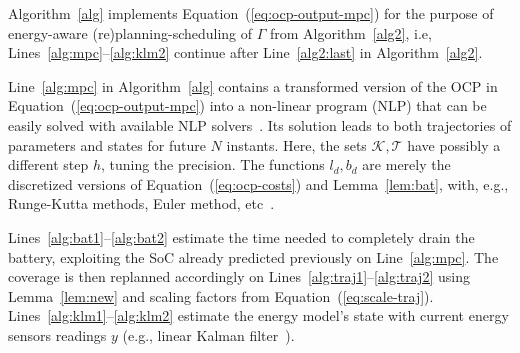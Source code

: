 \documentclass[letterpaper,10pt,journal,twoside]{IEEEtran}
\theoremstyle{definition}
\begin{document}
Algorithm~\ref{alg} implements Equation~(\ref{eq:ocp-output-mpc}) for the purpose of energy-aware (re)planning-scheduling of $\Gamma$ from Algorithm~\ref{alg2}, i.e, Lines~\ref{alg:mpc}--\ref{alg:klm2} continue after Line~\ref{alg2:last} in Algorithm~\ref{alg2}. 

Line~\ref{alg:mpc} in Algorithm~\ref{alg} contains a transformed version of the OCP in Equation~(\ref{eq:ocp-output-mpc}) into a non-linear program (NLP) that can be easily solved with available NLP solvers~\cite{rawlings2017model}. Its solution leads to both trajectories of parameters and states for future $N$ instants. Here, the sets $\mathcal{K},\mathcal{T}$ have possibly a different step $h$, tuning the precision. The functions $l_d,b_d$ are merely the discretized versions of Equation~(\ref{eq:ocp-costs}) and Lemma~\ref{lem:bat}, with, e.g., Runge-Kutta methods, Euler method, etc~\cite{iserles2009first}.

Lines~\ref{alg:bat1}--\ref{alg:bat2} estimate the time needed to completely drain the battery, exploiting the SoC already predicted previously on Line~\ref{alg:mpc}. The coverage is then replanned accordingly on Lines~\ref{alg:traj1}--\ref{alg:traj2} using Lemma~\ref{lem:new} and scaling factors from Equation~(\ref{eq:scale-traj}). Lines~\ref{alg:klm1}--\ref{alg:klm2} estimate the energy model's state with current energy sensors readings $y$ (e.g., linear Kalman filter~\cite{kalman1960new}).





\end{document}
